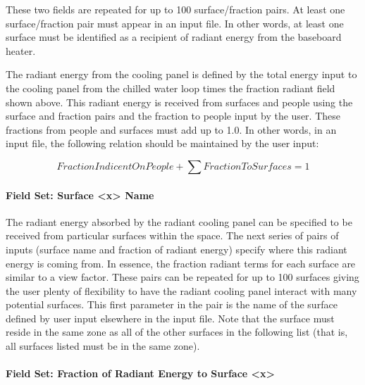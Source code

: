 These two fields are repeated for up to 100 surface/fraction pairs. At least one surface/fraction pair must appear in an input file. In other words, at least one surface must be identified as a recipient of radiant energy from the baseboard heater.

The radiant energy from the cooling panel is defined by the total energy input to the cooling panel from the chilled water loop times the fraction radiant field shown above. This radiant energy is received from surfaces and people using the surface and fraction pairs and the fraction to people input by the user. These fractions from people and surfaces must add up to 1.0. In other words, in an input file, the following relation should be maintained by the user input:

\begin{equation}
FractionIndicentOnPeople + \sum {FractionToSurfaces} = 1
\end{equation}

\paragraph{Field Set: Surface \textless{}x\textgreater{} Name}\label{field-set-surface-x-name-1}

The radiant energy absorbed by the radiant cooling panel can be specified to be received from particular surfaces within the space.  The next series of pairs of inputs (surface name and fraction of radiant energy) specify where this radiant energy is coming from.  In essence, the fraction radiant terms for each surface are similar to a view factor.  These pairs can be repeated for up to 100 surfaces giving the user plenty of flexibility to have the radiant cooling panel interact with many potential surfaces.  This first parameter in the pair is the name of the surface defined by user input elsewhere in the input file.  Note that the surface must reside in the same zone as all of the other surfaces in the following list (that is, all surfaces listed must be in the same zone).

\paragraph{Field Set: Fraction of Radiant Energy to Surface \textless{}x\textgreater{}}\label{field-set-fraction-of-radiant-energy-to-surface-x-1}

